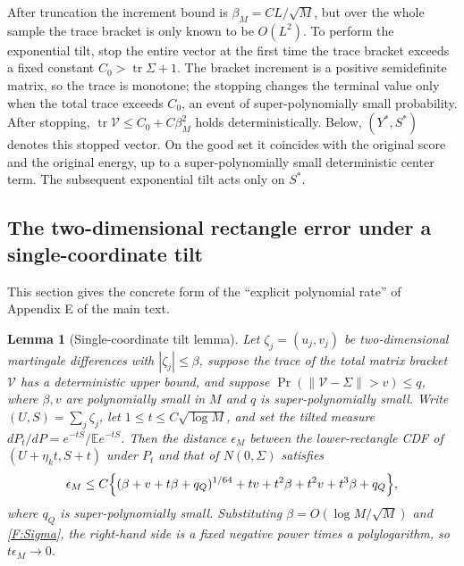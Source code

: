 \documentclass[a4paper,11pt]{article}
\newtheorem{lemma}[theorem]{Lemma}
\numberwithin{equation}{section}
\newcommand{\E}{\mathbb E}
\begin{document}
After truncation the increment bound is $\beta_M=CL/\sqrt M$, but over the whole sample the trace bracket is
only known to be $O(L^2)$. To perform the exponential tilt, stop the entire vector at the first time the trace
bracket exceeds a fixed constant $C_0>\operatorname{tr}\Sigma+1$. The bracket increment is a positive
semidefinite matrix, so the trace is monotone; the stopping changes the terminal value only when the total
trace exceeds $C_0$, an event of super-polynomially small probability. After stopping,
$\operatorname{tr}\mathcal V\le C_0+C\beta_M^2$ holds deterministically. Below, $(Y^*,S^*)$ denotes this
stopped vector. On the good set it coincides with the original score and the original energy, up to a
super-polynomially small deterministic center term. The subsequent exponential tilt acts only on $S^*$.

\subsection{The two-dimensional rectangle error under a single-coordinate tilt}

This section gives the concrete form of the ``explicit polynomial rate'' of Appendix E of the main text.

\begin{lemma}[Single-coordinate tilt lemma]\label{F:lem:tilt}
Let $\zeta_j=(u_j,v_j)$ be two-dimensional martingale differences with $|\zeta_j|\le\beta$, suppose the trace
of the total matrix bracket $\mathcal V$ has a deterministic upper bound, and suppose
$\Pr(\|\mathcal V-\Sigma\|>v)\le q$, where $\beta,v$ are polynomially small in $M$ and $q$ is
super-polynomially small. Write $(U,S)=\sum_j\zeta_j$, let $1\le t\le C\sqrt{\log M}$, and set the tilted
measure $dP_t/dP=e^{-tS}/\E e^{-tS}$. Then the distance $\epsilon_M$ between the lower-rectangle CDF of
$(U+\eta_kt,S+t)$ under $P_t$ and that of $N(0,\Sigma)$ satisfies
\begin{equation}
\epsilon_M\le C\Bigl\{(\beta+v+t\beta+q_Q)^{1/64}+tv+t^2\beta+t^2v+t^3\beta+q_Q\Bigr\},\label{F:rate}
\end{equation}
where $q_Q$ is super-polynomially small. Substituting $\beta=O(\log M/\sqrt M)$ and \eqref{F:Sigma}, the
right-hand side is a fixed negative power times a polylogarithm, so $t\epsilon_M\to0$.
\end{lemma}
\end{document}
